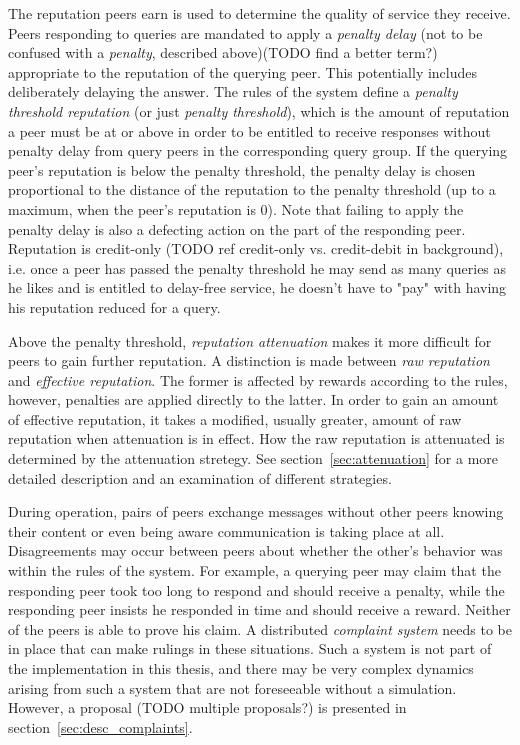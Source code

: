 The reputation peers earn is used to determine the quality of service they
receive. Peers responding to queries are mandated to apply a \emph{penalty
delay} (not to be confused with a \emph{penalty}, described above)(TODO find a
better term?) appropriate to the reputation of the querying peer. This
potentially includes deliberately delaying the answer. The rules of the system
define a \emph{penalty threshold reputation} (or just \emph{penalty threshold}),
which is the amount of reputation a peer must be at or above in order to be
entitled to receive responses without penalty delay from query peers in the
corresponding query group. If the querying peer's reputation is below the
penalty threshold, the penalty delay is chosen proportional to the distance of
the reputation to the penalty threshold (up to a maximum, when the peer's
reputation is 0). Note that failing to apply the penalty delay is also a
defecting action on the part of the responding peer. Reputation is credit-only
(TODO ref credit-only vs. credit-debit in background), i.e. once a peer has
passed the penalty threshold he may send as many queries as he likes and is
entitled to delay-free service, he doesn't have to "pay" with having his
reputation reduced for a query.

Above the penalty threshold, \emph{reputation attenuation} makes it more
difficult for peers to gain further reputation. A distinction is made between
\emph{raw reputation} and \emph{effective reputation}. The former is affected by
rewards according to the rules, however, penalties are applied directly to the
latter. In order to gain an amount of effective reputation, it takes a modified,
usually greater, amount of raw reputation when attenuation is in effect. How the
raw reputation is attenuated is determined by the attenuation stretegy. See
section~\ref{sec:attenuation} for a more detailed description and an examination
of different strategies.

During operation, pairs of peers exchange messages without other peers knowing
their content or even being aware communication is taking place at all.
Disagreements may occur between peers about whether the other's behavior was
within the rules of the system. For example, a querying peer may claim that the
responding peer took too long to respond and should receive a penalty, while the
responding peer insists he responded in time and should receive a reward.
Neither of the peers is able to prove his claim. A distributed \emph{complaint
system} needs to be in place that can make rulings in these situations. Such a
system is not part of the implementation in this thesis, and there may be very
complex dynamics arising from such a system that are not foreseeable without a
simulation. However, a proposal (TODO multiple proposals?) is presented in
section~\ref{sec:desc_complaints}.

